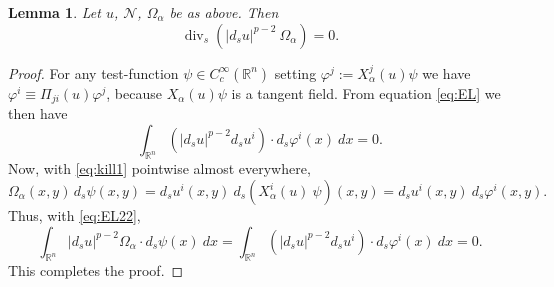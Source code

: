 \documentclass[12pt]{amsart}
\newtheorem{lemma}[theorem]{Lemma}
\theoremstyle{definition}
\newcommand{\R}{\mathbb{R}}
\newcommand{\brac}[1]{\left (#1 \right )}
\numberwithin{theorem}{section} \numberwithin{equation}{section}
\renewcommand{\div}{\operatorname{div}}
\begin{document}
\begin{lemma}
Let $u$, $\mathcal{N}$, $\Omega_\alpha$ be as above. Then
\[
 \div_s \brac{|d_s u|^{p-2} \ \Omega_\alpha} = 0.
\]
\end{lemma}
\begin{proof}
For any test-function $\psi \in C_c^\infty(\R^n)$ setting $\varphi^j := X^j_\alpha(u)\psi$ we have $\varphi^i \equiv \Pi_{ji}(u) \varphi^j$, because $X_\alpha(u)\psi$ is a tangent field. 
From equation \eqref{eq:EL} we then have
\begin{equation}\label{eq:EL22}
 \int_{\R^n} \brac{|d_s u|^{p-2} d_su^i} \cdot d_s \varphi^i(x)\ dx = 0.
\end{equation}
Now, with \eqref{eq:kill1} pointwise almost everywhere,
\[
 \Omega_\alpha(x,y)\, d_s \psi(x,y) = d_s u^i(x,y)\ d_s \brac{X_\alpha^i(u)\ \psi}(x,y) = d_s u^i(x,y)\ d_s \varphi^i(x,y).
\]
Thus, with \eqref{eq:EL22},
\[
 \int_{\R^n} |d_s u|^{p-2} \Omega_\alpha\cdot d_s \psi(x)\ dx = \int_{\R^n} \brac{|d_s u|^{p-2} d_su^i} \cdot d_s \varphi^i(x)\ dx = 0.
\]
This completes the proof. 
\end{proof}
% 
% 
% 
\end{document}
